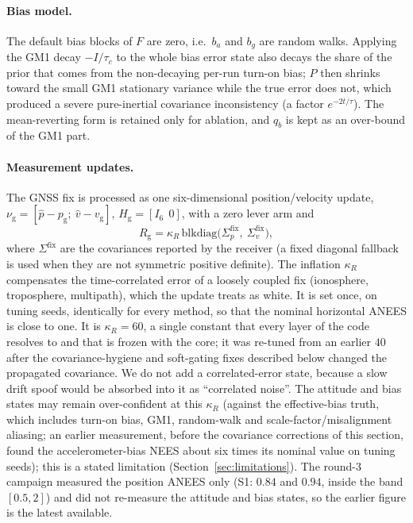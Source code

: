 \documentclass[journal]{IEEEtran}
\begin{document}
\paragraph{Bias model.}
The default bias blocks of $F$ are zero, i.e.\ $b_a$ and $b_g$ are random walks. Applying the GM1 decay
$-I/\tau_c$ to the whole bias error state also decays the share of the prior that comes from the
non-decaying per-run turn-on bias; $P$ then shrinks toward the small GM1 stationary variance while the true
error does not, which produced a severe pure-inertial covariance inconsistency (a factor $e^{-2t/\tau}$).
The mean-reverting form is retained only for ablation, and $q_b$ is kept as an over-bound of the GM1 part.

\paragraph{Measurement updates.}
The GNSS fix is processed as one six-dimensional position/velocity update, $\nu_{\mathrm{g}} = [\hat p - p_{\mathrm{g}};\ \hat v - v_{\mathrm{g}}]$,
$H_{\mathrm{g}} = [I_6\ \ 0]$, with a zero lever arm and
\begin{equation}
R_{\mathrm{g}} = \kappa_R\,\mathrm{blkdiag}\big(\Sigma_{p}^{\mathrm{fix}},\ \Sigma_{v}^{\mathrm{fix}}\big),
\label{eq:rgnss}
\end{equation}
where $\Sigma^{\mathrm{fix}}$ are the covariances reported by the receiver (a fixed diagonal fallback is
used when they are not symmetric positive definite). The inflation $\kappa_R$ compensates the
time-correlated error of a loosely coupled fix (ionosphere, troposphere, multipath), which the update
treats as white. It is set once, on tuning seeds, identically for every method, so that the nominal
horizontal ANEES is close to one. It is $\kappa_R = 60$, a single constant that every layer of the code
resolves to and that is frozen with the core; it was re-tuned from an earlier $40$ after the covariance-hygiene
and soft-gating fixes described below changed the propagated covariance. We do not add a
correlated-error state, because a slow drift spoof would be absorbed into it as ``correlated noise''.
The attitude and bias states may remain over-confident at this $\kappa_R$ (against the effective-bias truth,
which includes turn-on bias, GM1, random-walk and scale-factor/misalignment aliasing; an earlier measurement,
before the covariance corrections of this section, found the accelerometer-bias NEES about six times its nominal value on
tuning seeds); this is a stated limitation (Section~\ref{sec:limitations}). The round-3 campaign measured the position ANEES only (S1: $0.84$ and $0.94$, inside the band $[0.5,2]$) and did not re-measure the attitude and bias states, so the earlier figure is the latest available.
\end{document}
